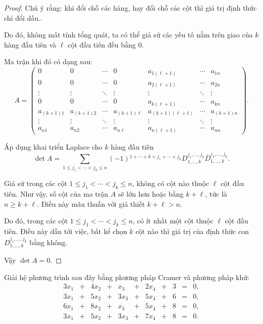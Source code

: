 \documentclass[class=nhvh-linear-algebra,crop=false]{standalone}
\begin{document}
\begin{proof}
	\par Chú ý rằng: khi đổi chỗ các hàng, hay đổi chỗ các cột thì giá trị định thức chỉ đổi dấu..
	\par Do đó, không mất tính tổng quát, ta có thể giả sử các yếu tố nằm trên giao của $k$ hàng đầu tiên và $\ell$ cột đầu tiên đều bằng 0.
	\par Ma trận khi đó có dạng sau:
	\[
		A=
		\begin{pmatrix}
			0          & 0          & \cdots & 0             & a_{1(\ell+1)}     & \cdots & a_{1n}     \\
			0          & 0          & \cdots & 0             & a_{2(\ell+1)}     & \cdots & a_{2n}     \\
			\vdots     & \vdots     & \ddots & \vdots        & \vdots            & \ddots & \vdots     \\
			0          & 0          & \cdots & 0             & a_{k(\ell+1)}     & \cdots & a_{kn}     \\
			a_{(k+1)1} & a_{(k+1)2} & \cdots & a_{(k+1)\ell} & a_{(k+1)(\ell+1)} & \cdots & a_{(k+1)n} \\
			\vdots     & \vdots     & \ddots & \vdots        & \vdots            & \ddots & \vdots     \\
			a_{n1}     & a_{n2}     & \cdots & a_{n\ell}     & a_{n(\ell+1)}     & \cdots & a_{nn}
		\end{pmatrix}.
	\]
	\par Áp dụng khai triển Laplace cho $k$ hàng đầu tiên
	\[
		\det A = \sum_{1\le j_{1} < \cdots < j_{k}\le n}(-1){}^{1+\cdots+k+j_{1}+\cdots+j_{k}}D_{1,\ldots,k}^{j_{1},\ldots,j_{k}}\overline{D}_{1,\ldots,k}^{j_{1},\ldots,j_{k}}.
	\]
	\par Giả sử trong các cột $1\le j_{1} < \cdots < j_{k}\le n$, không có cột nào thuộc $\ell$ cột đầu tiên. Như vậy, số cột của ma trận $A$ sẽ lớn hơn hoặc bằng $k + \ell$, tức là $n \ge k + \ell$. Điều này mâu thuẫn với giả thiết $k + \ell > n$.
	\par Do đó, trong các cột $1\le j_{1} < \cdots < j_{k}\le n$, có ít nhất một cột thuộc $\ell$ cột đầu tiên. Điều này dẫn tới việc, bất kể chọn $k$ cột nào thì giá trị của định thức con  $D^{j_{1},\ldots,j_{k}}_{1,\ldots,k}$ bằng không.
	\par Vậy $\det A = 0$.
\end{proof}

\begin{exercise}
	\par Giải hệ phương trình sau đây bằng phương pháp Cramer và phương pháp khử:
	\[
		\begin{array}{ccccccccccc}
			3x_{1} & + & 4x_{2} & + & x_{3}  & + & 2x_{4} & + & 3 & = & 0, \\
			3x_{1} & + & 5x_{2} & + & 3x_{3} & + & 5x_{4} & + & 6 & = & 0, \\
			6x_{1} & + & 8x_{2} & + & x_{3}  & + & 5x_{4} & + & 8 & = & 0, \\
			3x_{1} & + & 5x_{2} & + & 3x_{3} & + & 7x_{4} & + & 8 & = & 0.
		\end{array}
	\]
\end{exercise}
\end{document}
